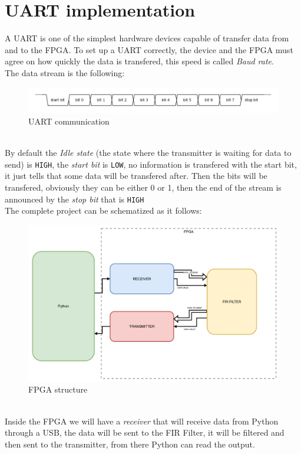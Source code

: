 \documentclass[11pt,a4paper,twocolumn]{IEEEtran}
\begin{document}
	\section{UART implementation}
	A UART is one of the simplest hardware devices capable of transfer data from and to the FPGA.
	To set up a UART correctly, the device and the FPGA must agree on how quickly the data is transfered, this speed is called \emph{Baud rate}.\\
	The data stream is the following:
	\begin{figure}[h]
		\centering
		\includegraphics[width=1\linewidth]{img/baud}
		\caption{UART communication}
	\end{figure}\\
	By default the \emph{Idle state} (the state where the transmitter is waiting for data to send) is \texttt{HIGH}, the \emph{start bit} is \texttt{LOW}, no information is transfered with the start bit, it just tells that some data will be transfered after. Then the bits will be transfered, obviously they can be either 0 or 1, then the end of the stream is announced by the \emph{stop bit} that is \texttt{HIGH}\medskip\\
	The complete project can be schematized as it follows:
	\begin{figure}[h]
		\centering
		\includegraphics[width=1\linewidth]{img/projectcomplete}
		\caption{FPGA structure}
	\end{figure}\\
	Inside the FPGA we will have a \emph{receiver} that will receive data from Python through a USB, the data will be sent to the FIR Filter, it will be filtered and then sent to the transmitter, from there Python can read the output.\\
\end{document}
